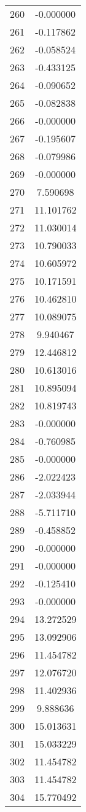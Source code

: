 \documentclass[12pt]{article}
\begin{document}
\begin{longtable}{@{}cc@{}}
260 & -0.000000 \\
261 & -0.117862 \\
262 & -0.058524 \\
263 & -0.433125 \\
264 & -0.090652 \\
265 & -0.082838 \\
266 & -0.000000 \\
267 & -0.195607 \\
268 & -0.079986 \\
269 & -0.000000 \\
270 & 7.590698 \\
271 & 11.101762 \\
272 & 11.030014 \\
273 & 10.790033 \\
274 & 10.605972 \\
275 & 10.171591 \\
276 & 10.462810 \\
277 & 10.089075 \\
278 & 9.940467 \\
279 & 12.446812 \\
280 & 10.613016 \\
281 & 10.895094 \\
282 & 10.819743 \\
283 & -0.000000 \\
284 & -0.760985 \\
285 & -0.000000 \\
286 & -2.022423 \\
287 & -2.033944 \\
288 & -5.711710 \\
289 & -0.458852 \\
290 & -0.000000 \\
291 & -0.000000 \\
292 & -0.125410 \\
293 & -0.000000 \\
294 & 13.272529 \\
295 & 13.092906 \\
296 & 11.454782 \\
297 & 12.076720 \\
298 & 11.402936 \\
299 & 9.888636 \\
300 & 15.013631 \\
301 & 15.033229 \\
302 & 11.454782 \\
303 & 11.454782 \\
304 & 15.770492 \\

\end{longtable}
\end{document}

